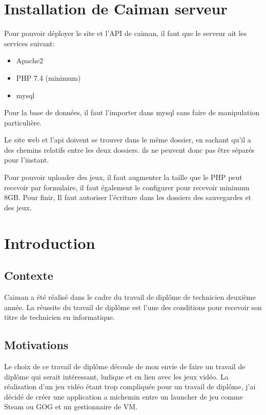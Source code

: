 \documentclass[a4paper,12pt,french]{sphinxmanual}
\begin{document}
\chapter{Installation de Caiman serveur}
\label{\detokenize{resume:installation-de-caiman-serveur}}
\sphinxAtStartPar
Pour pouvoir déployer le site et l’API de caiman, il faut que le serveur ait les services suivant:
\begin{itemize}
\item {} 
\sphinxAtStartPar
Apache2

\item {} 
\sphinxAtStartPar
PHP 7.4 (minimum)

\item {} 
\sphinxAtStartPar
mysql

\end{itemize}

\sphinxAtStartPar
Pour la base de données, il faut l’importer dans mysql sans faire de manipulation particulière.

\sphinxAtStartPar
Le site web et l’api doivent se trouver dans le même dossier, en sachant qu’il a des chemins relatifs entre les deux dossiers. ils ne peuvent donc pas être séparés pour l’instant.

\sphinxAtStartPar
Pour pouvoir uploader des jeux, il faut augmenter la taille que le PHP peut recevoir par formulaire, il faut également le configurer pour recevoir minimum 8GB. Pour finir, Il faut autoriser l’écriture dans les dossiers des sauvegardes et des jeux.


\chapter{Introduction}
\label{\detokenize{introduction:introduction}}\label{\detokenize{introduction::doc}}

\section{Contexte}
\label{\detokenize{introduction:contexte}}
\sphinxAtStartPar
Caiman a été réalisé dans le cadre du travail de diplôme de technicien deuxième année. La réussite du travail de diplôme est l’une des conditions pour recevoir son titre de technicien en informatique.


\section{Motivations}
\label{\detokenize{introduction:motivations}}
\sphinxAtStartPar
Le choix de ce travail de diplôme découle de mon envie de faire un travail de diplôme qui serait intéressant, ludique et en lien avec les jeux vidéo. La réalisation d’un jeu vidéo étant trop compliquée pour un travail de diplôme, j’ai décidé de créer une application a mi\sphinxhyphen{}chemin entre un launcher de jeu comme Steam ou GOG et un gestionnaire de VM.
\end{document}
